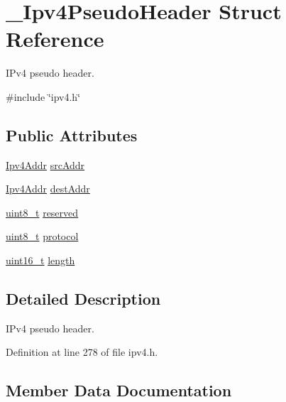 \hypertarget{struct__Ipv4PseudoHeader}{}\section{\+\_\+\+Ipv4\+Pseudo\+Header Struct Reference}
\label{struct__Ipv4PseudoHeader}


I\+Pv4 pseudo header.  




{\ttfamily \#include \char`\"{}ipv4.\+h\char`\"{}}

\subsection*{Public Attributes}
\begin{DoxyCompactItemize}
\item 
\hyperlink{ipv4_8h_a411debb3d770caa0c06d3f73367da37f}{Ipv4\+Addr} \hyperlink{struct__Ipv4PseudoHeader_a3f2e436731b26b12c65aa5666f990bec}{src\+Addr}
\item 
\hyperlink{ipv4_8h_a411debb3d770caa0c06d3f73367da37f}{Ipv4\+Addr} \hyperlink{struct__Ipv4PseudoHeader_addf5a13e280d609cbe1fb5cb5c72f1d7}{dest\+Addr}
\item 
\hyperlink{stdint_8h_aba7bc1797add20fe3efdf37ced1182c5}{uint8\+\_\+t} \hyperlink{struct__Ipv4PseudoHeader_a29142e7c1fa3f42b5d30c8a478004dc0}{reserved}
\item 
\hyperlink{stdint_8h_aba7bc1797add20fe3efdf37ced1182c5}{uint8\+\_\+t} \hyperlink{struct__Ipv4PseudoHeader_ae93c51d6bf3425cd5389a04ad39dbc14}{protocol}
\item 
\hyperlink{stdint_8h_a273cf69d639a59973b6019625df33e30}{uint16\+\_\+t} \hyperlink{struct__Ipv4PseudoHeader_a2ab9f4dca10bae4886febdafef0d40b9}{length}
\end{DoxyCompactItemize}


\subsection{Detailed Description}
I\+Pv4 pseudo header. 

Definition at line 278 of file ipv4.\+h.



\subsection{Member Data Documentation}
\mbox{\label{struct__Ipv4PseudoHeader_addf5a13e280d609cbe1fb5cb5c72f1d7}} 
